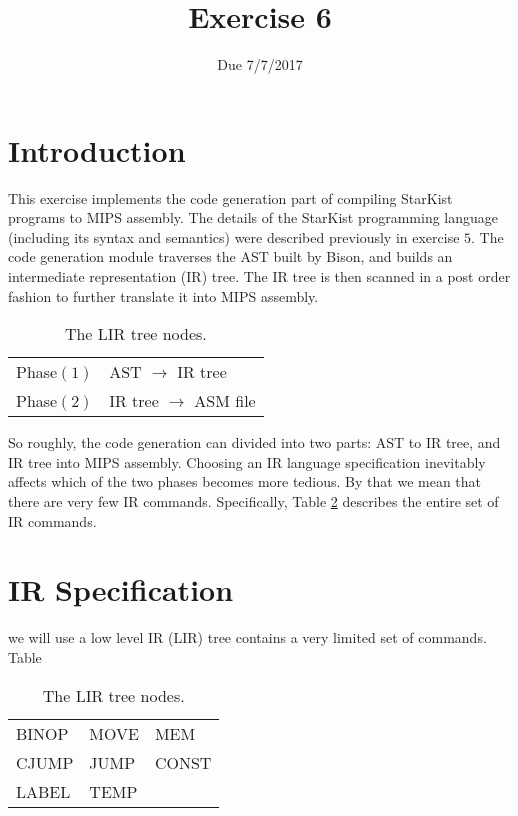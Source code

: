\documentclass{article}
\begin{document}
\title{Exercise 6}
\date{Due 7/7/2017}
\maketitle

\section{Introduction}
This exercise implements the code generation part of compiling StarKist
programs to MIPS assembly. The details of the StarKist programming language
(including its syntax and semantics) were described previously in exercise $5$.
The code generation module traverses the AST built by Bison,
and builds an intermediate representation (IR) tree.
The IR tree is then scanned in a post order fashion
to further translate it into MIPS assembly.
\begin{table}[h]
\centering
\begin{tabular}{ l l}
  Phase$(1)$   & AST     $\rightarrow$ IR tree  \\
  Phase$(2)$   & IR tree $\rightarrow$ ASM file \\
\end{tabular}
\caption{
The LIR tree nodes.
\label{Table_LIR_API_StarKist}}
\end{table}
So roughly, the code generation can divided into two parts:
AST to IR tree, and IR tree into MIPS assembly.
Choosing an IR language specification inevitably affects
which of the two phases becomes more tedious.
By that we mean that there are very few IR commands.
Specifically, Table \ref{Table_LIR_API_StarKist} describes
the entire set of IR commands.


\section{IR Specification}
we will use a low level IR (LIR) tree contains a very limited set of commands.
Table 

\begin{table}[h]
\centering
\begin{tabular}{ l l l}
  BINOP   & MOVE  & MEM    \\
  CJUMP   & JUMP  & CONST  \\
  LABEL   & TEMP  &        \\
\end{tabular}
\caption{
The LIR tree nodes.
\label{Table_LIR_API_StarKist}}
\end{table}
\end{document}
